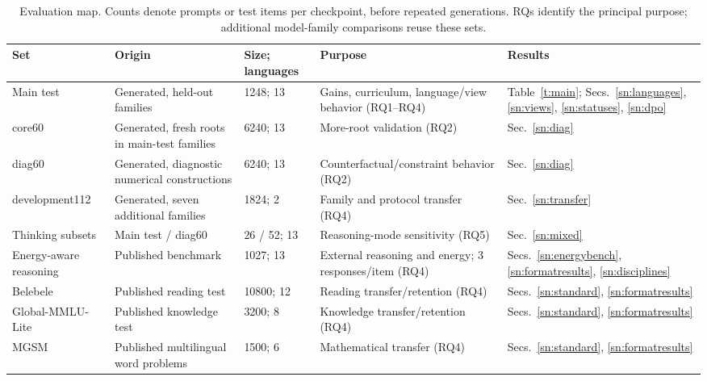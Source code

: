 \begin{table}[t]
\caption{Evaluation map. Counts denote prompts or test items per checkpoint, before repeated generations. RQs identify the principal purpose; additional model-family comparisons reuse these sets.}
\label{t:evalmap}
\centering
\footnotesize
\setlength{\tabcolsep}{4pt}
\begin{tabular}{p{}p{}p{}p{}p{}}
\hline
Set & Origin & Size; languages & Purpose & Results \\
\hline
Main test & Generated, held-out families & 1248; 13 & Gains, curriculum, language/view behavior (RQ1--RQ4) & Table~\ref{t:main}; Secs.~\ref{sn:languages}, \ref{sn:views}, \ref{sn:statuses}, \ref{sn:dpo} \\
core60 & Generated, fresh roots in main-test families & 6240; 13 & More-root validation (RQ2) & Sec.~\ref{sn:diag} \\
diag60 & Generated, diagnostic numerical constructions & 6240; 13 & Counterfactual/constraint behavior (RQ2) & Sec.~\ref{sn:diag} \\
development112 & Generated, seven additional families & 1824; 2 & Family and protocol transfer (RQ4) & Sec.~\ref{sn:transfer} \\
Thinking subsets & Main test / diag60 & 26 / 52; 13 & Reasoning-mode sensitivity (RQ5) & Sec.~\ref{sn:mixed} \\
Energy-aware reasoning & Published benchmark~\cite{dezarza2026energy} & 1027; 13 & External reasoning and energy; 3 responses/item (RQ4) & Secs.~\ref{sn:energybench}, \ref{sn:formatresults}, \ref{sn:disciplines} \\
Belebele & Published reading test~\cite{bandarkar2024belebele} & 10800; 12 & Reading transfer/retention (RQ4) & Secs.~\ref{sn:standard}, \ref{sn:formatresults} \\
Global-MMLU-Lite & Published knowledge test~\cite{singh2025global} & 3200; 8 & Knowledge transfer/retention (RQ4) & Secs.~\ref{sn:standard}, \ref{sn:formatresults} \\
MGSM & Published multilingual word problems~\cite{shi2022} & 1500; 6 & Mathematical transfer (RQ4) & Secs.~\ref{sn:standard}, \ref{sn:formatresults} \\
\hline
\end{tabular}
\end{table}
